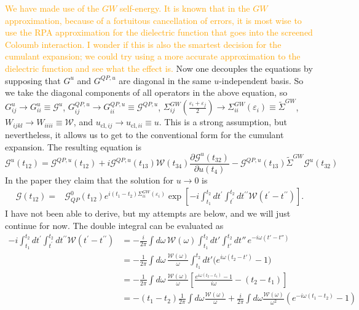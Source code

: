 \textcolor{orange}{%
We have made use of the $GW$ self-energy. It is known that in the $GW$ approximation, because of a fortuitous cancellation of errors, it is most wise to use the RPA approximation for the dielectric function that goes into the screened Coloumb interaction. I wonder if this is also the smartest decision for the cumulant expansion; we could try using a more accurate approximation to the dielectric function and see what the effect is.} Now one decouples the equations by supposing that $G^{u}$ and $G^{Q P, u}$ are diagonal in the same $u$-independent basis. So we take the diagonal components of all operators in the above equation, so $G^{u}_{ij} \rightarrow G^{u}_{ii}\equiv \mathcal{G}^{u}$, $G^{Q P, u}_{ij} \rightarrow G^{Q P, u}_{ii} \equiv \mathcal{G}^{Q P, u}$, $\Sigma^{GW}_{ij}\left(\frac{\varepsilon_{i}+\varepsilon_{j}}{2}\right) \rightarrow \Sigma^{GW}_{ii}\left(\varepsilon_i\right) \equiv \tilde{\Sigma}^{GW}$, $W_{ijkl} \rightarrow W_{iiii} \equiv \mathcal{W}$, and $u_{\mathrm{cl}, ij} \rightarrow u_{\mathrm{cl}, ii} \equiv u$. This is a strong assumption, but nevertheless, it allows us to get to the conventional form for the cumulant expansion. The resulting equation is
\begin{equation}
\mathcal{G}^{u}(t_{12}) = \mathcal{G}^{Q P, u}(t_{12}) + i \mathcal{G}^{Q P, u}(t_{13}) \mathcal{W}(t_{34}) \frac{\partial \mathcal{G}^{u}(t_{32})}{\partial {u}(t_4)} - \mathcal{G}^{Q P, u}(t_{13}) \tilde{\Sigma}^{GW} \mathcal{G}^{u}(t_{32})
\end{equation}
In the paper they claim that the solution for $u \rightarrow 0$ is
\begin{align}
\mathcal{G}\left(t_{12}\right)= & \mathcal{G}_{Q P}^{0}\left(t_{12}\right) e^{i\left(t_{1}-t_{2}\right) \Sigma_{i i}^{G W}\left(\varepsilon_{i}\right)} \exp \left[-i \int_{t_{1}}^{t_{2}} d t^{\prime} \int_{t^{\prime}}^{t_{2}} d t^{\prime \prime} \mathcal{W}\left(t^{\prime}-t^{\prime \prime}\right)\right].
\end{align}
 I have not been able to derive, but my attempts are below, and we will just continue for now. The double integral can be evaluated as
\begin{align}
-i \int_{t_{1}}^{t_{2}} d t^{\prime} \int_{t^{\prime}}^{t_{2}} d t^{\prime \prime} \mathcal{W}\left(t^{\prime}-t^{\prime \prime}\right) 
\label{a}
& =-\frac{i}{2\pi} \int d\omega\, \mathcal W(\omega)
\int_{t_1}^{t_2} dt' \int_{t'}^{t_2} dt''\, e^{-i\omega (t' - t'')}\\
&= -\frac{1}{2\pi} \int d\omega\, \frac{\mathcal W(\omega)}{\omega}
\int_{t_1}^{t_2} dt' \Big( e^{i\omega (t_2-t')} - 1 \Big) 
\label{b}
\\
&= -\frac{1}{2\pi} \int d\omega\, \frac{\mathcal W(\omega)}{\omega}
\left[ \frac{e^{i\omega (t_2-t_1)} - 1}{i\omega} - (t_2-t_1) \right] 
\label{c}
\\
&=-\left(t_{1}-t_{2}\right) \frac{1}{2 \pi} \int d \omega \frac{\mathcal{W}(\omega)}{\omega} +\frac{i}{2 \pi} \int d \omega \frac{\mathcal{W}(\omega)}{\omega^{2}}\left(e^{-i \omega\left(t_{1}-t_{2}\right)}-1\right)
\label{d}
\end{align}
